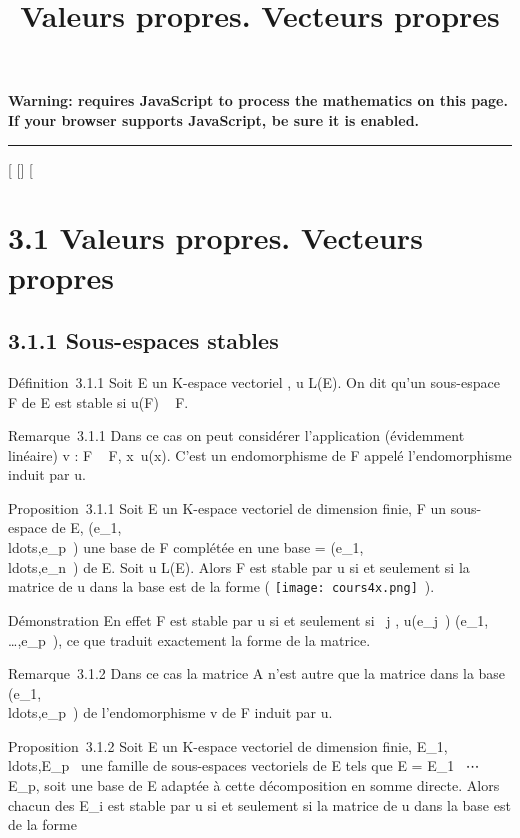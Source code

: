 \documentclass[]{article}
\title{Valeurs propres. Vecteurs propres}
\author{}
\date{}
\begin{document}
\maketitle

\textbf{Warning: 
requires JavaScript to process the mathematics on this page.\\ If your
browser supports JavaScript, be sure it is enabled.}

\begin{center}\rule{3in}{0.4pt}\end{center}

[
[]
[

\section{3.1 Valeurs propres. Vecteurs propres}

\subsection{3.1.1 Sous-espaces stables}

Définition~3.1.1 Soit E un K-espace vectoriel , u \in L(E). On dit qu'un
sous-espace F de E est stable si u(F) \subset~ F.

Remarque~3.1.1 Dans ce cas on peut considérer l'application (évidemment
linéaire) v : F \rightarrow~ F, x\mapsto~u(x). C'est un
endomorphisme de F appelé l'endomorphisme induit par u.

Proposition~3.1.1 Soit E un K-espace vectoriel de dimension finie, F un
sous-espace de E,
(e_1,\\ldots,e_p~)
une base de F complétée en une base  =
(e_1,\\ldots,e_n~)
de E. Soit u \in L(E). Alors F est stable par u si et seulement si la
matrice de u dans la base  est de la forme \left (
\texttt{[image: cours4x.png]} \,\right ).

Démonstration En effet F est stable par u si et seulement si
\forall~j \in [1,p], u(e_j~)
\in\mathrmVect(e_1,\\\ldots,e_p~),
ce que traduit exactement la forme de la matrice.

Remarque~3.1.2 Dans ce cas la matrice A n'est autre que la matrice dans
la base
(e_1,\\ldots,e_p~)
de l'endomorphisme v de F induit par u.

Proposition~3.1.2 Soit E un K-espace vectoriel de dimension finie,
E_1,\\ldots,E_p~
une famille de sous-espaces vectoriels de E tels que E = E_1
\oplus~⋯ \oplus~ E_p, soit  une base de E
adaptée à cette décomposition en somme directe. Alors chacun des
E_i est stable par u si et seulement si la matrice de u dans la
base  est de la forme
\end{document}
